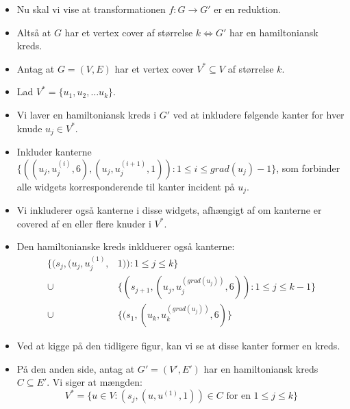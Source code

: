 \begin{frame}[allowframebreaks]
\begin{itemize}
		\item Nu skal vi vise at transformationen $f : G \rightarrow G'$ er en reduktion.
		\item Altså at $G$ har et vertex cover af størrelse $k \iff G'$  har en hamiltoniansk kreds.
		\item Antag at $G = (V,E)$ har et vertex cover $V^{*} \subseteq V$ af størrelse $k$.
		\item Lad $V^{*} = \{u_{1}, u_{2}, \ldots u_{k}\}$.
		\item Vi laver en hamiltoniansk kreds i $G'$ ved at inkludere følgende kanter for hver knude $u_{j} \in V^{*}$.
		\item Inkluder kanterne $\{((u_{j}, u_{j}^{(i)}, 6), (u_{j}, u_{j}^{(i+1)}, 1)) : 1 \le i \le grad(u_{j}) -1\}$, som forbinder alle widgets korresponderende til kanter incident på $u_{j}$.
		\item Vi inkluderer også kanterne i disse widgets, afhængigt af om kanterne er covered af en eller flere knuder i $V^{*}$.
		\item Den hamiltonianske kreds inklduerer også kanterne:
		      \begin{align*}
			      \{(s_{j}, (u_{j}, u_{j}^{(1)}, & 1)) : 1 \le j \le k\}                                             \\
			      \cup                           & \{(s_{j+1}, (u_{j}, u_{j}^{(grad(u_{j}))},6)) : 1 \le j \le k-1\} \\
			      \cup                           & \{(s_{1}, (u_{k}, u_{k}^{(grad(u_{j}))}, 6)\}
		      \end{align*}

		\item Ved at kigge på den tidligere figur, kan vi se at disse kanter former en kreds.
		\item På den anden side, antag at $G' = (V', E')$ har en hamiltoniansk kreds $C \subseteq E'$. Vi siger at mængden:
		      \begin{equation*}
			      V^{*} = \{u \in V : (s_{j}, (u, u^{(1)}, 1)) \in C \text{ for en } 1 \le j \le k\}
		      \end{equation*}


\end{itemize}
\end{frame}

